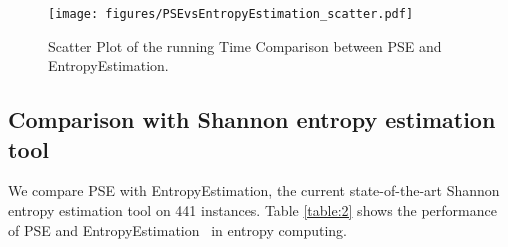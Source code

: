 \begin{figure}[h]
	\centering
	\texttt{[image: figures/PSEvsEntropyEstimation\_scatter.pdf]}
	\caption{Scatter Plot of the running Time Comparison between PSE and EntropyEstimation.
	}
	\label{figure:scatter}
\end{figure} 

\subsection{Comparison with Shannon entropy estimation tool}


We compare PSE with EntropyEstimation, the current state-of-the-art Shannon entropy estimation tool on 441 instances. 
Table \ref{table:2} shows the performance of PSE and EntropyEstimation~\cite{golia2022scalable} in entropy computing.


\begin{comment}
	\begin{table}[!ht]
		\centering
		\renewcommand{\arraystretch}{1.2}
		\begin{tabularx}{\linewidth}{>{\centering\arraybackslash}c *{3}{@{\hspace{1pt}}>{\raggedleft\arraybackslash}X} >{\raggedleft\arraybackslash}X}
			\toprule
			\multirow{2}{*}{tool}  & \multicolumn{3}{c}{Instances Solved} & \multirow{2}{*}{PAR-2 score} \\
			\cline{2-4}
			& Unique & Fastest & Total \\ 
			\midrule
			EntropyEstimation & 2 & 0 & 274 & 2421.46 \\
			PSE (ours) & \textbf{57} & \textbf{272} & \textbf{329} & \textbf{1531.56} \\
			\bottomrule
		\end{tabularx}
		\caption{Detailed performance comparison of PSE and EntropyEstimation. Unique represents the number of instances that can only be solved by a specific tool. Fastest represents the number of instances that a tool solves with the shortest time.}
		\label{table:2}
	\end{table}
	
\end{comment}

